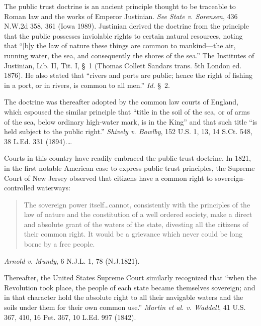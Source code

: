 

The public trust doctrine is an ancient principle thought to be traceable to
Roman law and the works of Emperor Justinian. \textit{See State v. Sorensen}, 
436 N.W.2d 358, 361 (Iowa 1989). Justinian derived the doctrine from the
principle that the public possesses inviolable rights to certain natural
resources, noting that ``[b]y the law of nature these things are common to
mankind---the air, running water, the sea, and consequently the shores of the
sea.'' The Institutes of Justinian, Lib. II, Tit. I, \S~1 (Thomas Collett
Sandars trans. 5th London ed. 1876). He also stated that ``rivers and ports are
public; hence the right of fishing in a port, or in rivers, is common to all
men.'' \textit{Id.} \S~2.

The doctrine was thereafter adopted by the common law courts of England, which
espoused the similar principle that ``title in the soil of the sea, or of arms
of the sea, below ordinary high-water mark, is in the King'' and that such title
``is held subject to the public right.'' \textit{Shively v. Bowlby},  152 U.S.
1, 13, 14 S.Ct. 548, 38 L.Ed. 331 (1894).{\dots}

Courts in this country have readily embraced the public trust doctrine. In 1821,
in the first notable American case to express public trust principles, the
Supreme Court of New Jersey observed that citizens have a common right to
sovereign-controlled waterways:
\begin{quote}
The sovereign power itself\ldots cannot, consistently with the principles of the
law of nature and the constitution of a well ordered society, make a direct and
absolute grant of the waters of the state, divesting all the citizens of their
common right. It would be a grievance which never could be long borne by a free
people.
\end{quote}
\textit{Arnold v. Mundy},  6 N.J.L. 1, 78 (N.J.1821).

Thereafter, the United States Supreme Court similarly recognized that ``when the
Revolution took place, the people of each state became themselves sovereign; and
in that character hold the absolute right to all their navigable waters and the
soils under them for their own common use.'' \textit{Martin et al. v. Waddell}, 
41 U.S. 367, 410, 16 Pet. 367, 10 L.Ed. 997 (1842).

